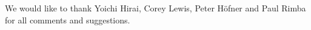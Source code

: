 \documentclass[sigplan,10pt]{acmart}\settopmatter{printfolios=true,printccs=false,printacmref=false}
\begin{document}
\begin{acks}                            %


We would like to thank Yoichi Hirai, Corey Lewis, Peter H\"ofner
and Paul Rimba for all comments and suggestions.
\end{acks}





\end{document}
